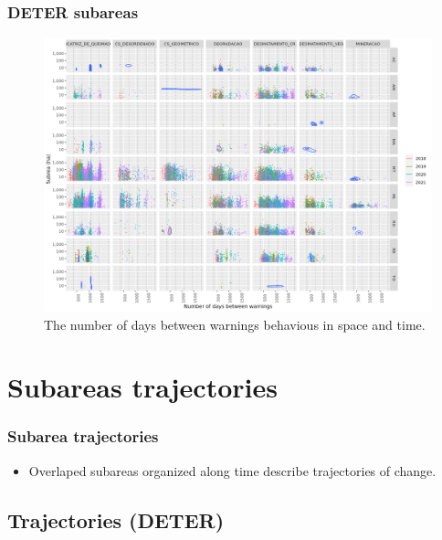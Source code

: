 \documentclass[aspectratio=169]{beamer}
\begin{document}
\begin{frame}
    \frametitle{DETER subareas}
    \begin{figure}[h] 
        \includegraphics[width=0.65\linewidth]
        {./figures/plot_deter_subarea_density_by_state_first-type_nwarnings.png}
        \caption{The number of days between warnings behavious in space and 
        time.}
        \label{fig:deter_subarea_density_state_first_type_nwarnings}
    \end{figure}
\end{frame}





\section{Subareas trajectories} 

\begin{frame}
    \frametitle{Subarea trajectories}
    \begin{itemize}
        \item Overlaped subareas organized along time describe trajectories of
            change.
    \end{itemize}
\end{frame}


\subsection{Trajectories (DETER)} 
\end{document}
